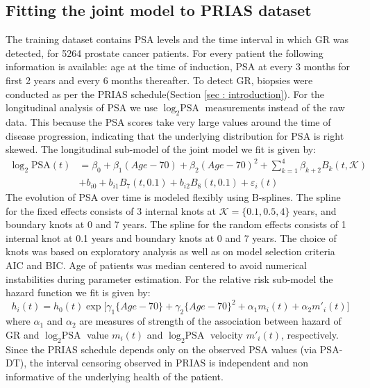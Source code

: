 \subsection{Fitting the joint model to PRIAS dataset}
\label{subsec : jm_fit_prias}
The training dataset contains PSA levels and the time interval in which GR was detected, for 5264 prostate cancer patients. For every patient the following information is available: age at the time of induction, PSA at every 3 months for first 2 years and every 6 months thereafter. To detect GR, biopsies were conducted as per the PRIAS schedule(Section \ref{sec : introduction}). For the longitudinal analysis of PSA we use $\log_2 \mbox{PSA}$ measurements instead of the raw data. This because the PSA scores take very large values around the time of disease progression, indicating that the underlying distribution for PSA is right skewed. The longitudinal sub-model of the joint model we fit is given by:
\begin{equation}
\label{eq : long_model_prias}
\begin{aligned}
\log_2 \mbox{PSA}(t) &= \beta_0 + \beta_1 (Age-70) + \beta_2 (Age-70)^2 + \sum_{k=1}^4 \beta_{k+2} B_k(t,\mathcal{K})\\ 
&+  b_{i0} + b_{i1} B_7(t, 0.1) + b_{i2} B_8(t, 0.1) +
\varepsilon_i(t)
\end{aligned}
\end{equation}
The evolution of PSA over time is modeled flexibly using B-splines. The spline for the fixed effects consists of 3 internal knots at $\mathcal{K} =\{0.1, 0.5, 4\}$ years, and boundary knots at 0 and 7 years. The spline for the random effects consists of 1 internal knot at 0.1 years and boundary knots at 0 and 7 years. The choice of knots was based on exploratory analysis as well as on model selection criteria AIC and BIC. Age of patients was median centered to avoid numerical instabilities during parameter estimation. For the relative risk sub-model the hazard function we fit is given by:
\begin{equation}
\label{eq : hazard_prias}
h_i(t) = h_0(t) \exp\big[\gamma_1 \{Age-70\}  + \gamma_2 \{Age-70\}^2 + \alpha_1 m_i(t) + \alpha_2 m'_i(t)\big]
\end{equation}
where $\alpha_1$ and $\alpha_2$ are measures of strength of the association between hazard of GR and $\log_2 \mbox{PSA}$ value $m_i(t)$ and $\log_2 \mbox{PSA}$ velocity $m'_i(t)$, respectively. Since the PRIAS schedule depends only on the observed PSA values (via PSA-DT), the interval censoring observed in PRIAS is independent and non informative of the underlying health of the patient.

